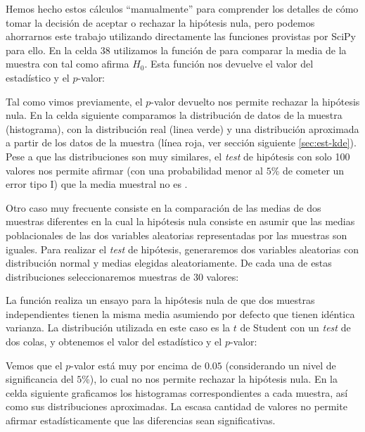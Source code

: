 
Hemos hecho estos cálculos ``manualmente'' para comprender los detalles de cómo tomar la decisión de aceptar o rechazar la hipótesis nula, pero podemos ahorrarnos este trabajo utilizando directamente las funciones provistas por SciPy para ello. En la celda 38 utilizamos la función  de  para comparar la media de la muestra con  tal como afirma $H_0$. Esta función nos devuelve el valor del estadístico y el $p$-valor:


Tal como vimos previamente, el $p$-valor devuelto nos permite rechazar la hipótesis nula. En la celda siguiente comparamos la distribución de datos de la muestra (histograma), con la distribución real (linea verde) y una distribución aproximada a partir de los datos de la muestra (línea roja, ver sección siguiente \ref{sec:est-kde}). Pese a que las distribuciones son muy similares, el \textit{test} de hipótesis con solo 100 valores nos permite afirmar (con una probabilidad menor al $5$\% de cometer un error tipo I) que la media muestral no es .


Otro caso muy frecuente consiste en la comparación de las medias de dos muestras diferentes en la cual la hipótesis nula consiste en asumir que las medias poblacionales de las dos variables aleatorias representadas por las muestras son iguales. Para realizar el \textit{test} de hipótesis, generaremos dos variables aleatorias con distribución normal y medias elegidas aleatoriamente. De cada una de estas distribuciones seleccionaremos muestras de 30 valores:


La función  realiza un ensayo para la hipótesis nula de que dos muestras independientes tienen la misma media asumiendo por defecto que tienen idéntica varianza. La distribución utilizada en este caso es la $t$ de Student con un \textit{test} de dos colas, y obtenemos el valor del estadístico y el $p$-valor:


Vemos que el $p$-valor está muy por encima de $0.05$ (considerando un nivel de significancia del $5$\%), lo cual no nos permite rechazar la hipótesis nula. En la celda siguiente graficamos los histogramas correspondientes a cada muestra, así como sus distribuciones aproximadas. La escasa cantidad de valores no permite afirmar estadísticamente que las diferencias sean significativas.

